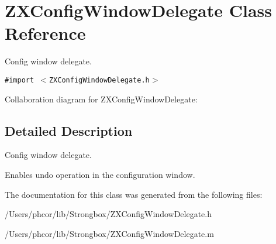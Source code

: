 \hypertarget{interface_z_x_config_window_delegate}{
\section{ZXConfigWindowDelegate Class Reference}
\label{interface_z_x_config_window_delegate}
}
Config window delegate.  


{\tt \#import $<$ZXConfigWindowDelegate.h$>$}

Collaboration diagram for ZXConfigWindowDelegate:

\subsection{Detailed Description}
Config window delegate. 

Enables undo operation in the configuration window. 

The documentation for this class was generated from the following files:\begin{CompactItemize}
\item 
/Users/phcor/lib/Strongbox/ZXConfigWindowDelegate.h\item 
/Users/phcor/lib/Strongbox/ZXConfigWindowDelegate.m\end{CompactItemize}
